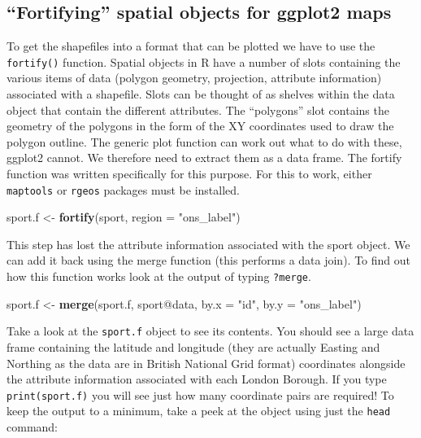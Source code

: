 \documentclass[]{article}
\newenvironment{Shaded}{}{}
\newcommand{\KeywordTok}[1]{\textcolor[rgb]{0.00,0.44,0.13}{\textbf{{#1}}}}
\newcommand{\DataTypeTok}[1]{\textcolor[rgb]{0.56,0.13,0.00}{{#1}}}
\newcommand{\StringTok}[1]{\textcolor[rgb]{0.25,0.44,0.63}{{#1}}}
\newcommand{\NormalTok}[1]{{#1}}
\begin{document}
\subsection{``Fortifying'' spatial objects for ggplot2
maps}\label{fortifying-spatial-objects-for-ggplot2-maps}

To get the shapefiles into a format that can be plotted we have to use
the \texttt{fortify()} function. Spatial objects in R have a number of
slots containing the various items of data (polygon geometry,
projection, attribute information) associated with a shapefile. Slots
can be thought of as shelves within the data object that contain the
different attributes. The ``polygons'' slot contains the geometry of the
polygons in the form of the XY coordinates used to draw the polygon
outline. The generic plot function can work out what to do with these,
ggplot2 cannot. We therefore need to extract them as a data frame. The
fortify function was written specifically for this purpose. For this to
work, either \texttt{maptools} or \texttt{rgeos} packages must be
installed.

\begin{Shaded}
\begin{Highlighting}[]
\NormalTok{sport.f <-}\StringTok{ }\KeywordTok{fortify}\NormalTok{(sport, }\DataTypeTok{region =} \StringTok{"ons_label"}\NormalTok{)}
\end{Highlighting}
\end{Shaded}

This step has lost the attribute information associated with the sport
object. We can add it back using the merge function (this performs a
data join). To find out how this function works look at the output of
typing \texttt{?merge}.

\begin{Shaded}
\begin{Highlighting}[]
\NormalTok{sport.f <-}\StringTok{ }\KeywordTok{merge}\NormalTok{(sport.f, sport@data, }\DataTypeTok{by.x =} \StringTok{"id"}\NormalTok{, }\DataTypeTok{by.y =} \StringTok{"ons_label"}\NormalTok{)}
\end{Highlighting}
\end{Shaded}

Take a look at the \texttt{sport.f} object to see its contents. You
should see a large data frame containing the latitude and longitude
(they are actually Easting and Northing as the data are in British
National Grid format) coordinates alongside the attribute information
associated with each London Borough. If you type \texttt{print(sport.f)}
you will see just how many coordinate pairs are required! To keep the
output to a minimum, take a peek at the object using just the
\texttt{head} command:
\end{document}
